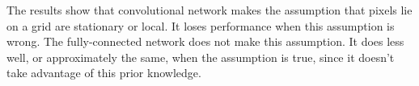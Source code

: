         The results show that convolutional network makes the assumption that pixels lie on a grid are stationary or local.
        It loses performance when this assumption is wrong.
        The fully-connected network does not make this assumption.
        It does less well, or approximately the same, when the assumption is true, since it doesn't take advantage of this prior knowledge. 